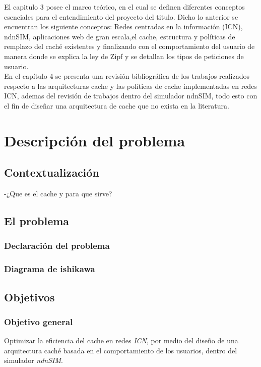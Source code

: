 \documentclass[12pt]{ociamthesis}  %
\begin{document}
El capitulo 3 posee el marco teórico, en el cual se definen diferentes conceptos esenciales para el entendimiento del proyecto del titulo. Dicho lo anterior se encuentran los siguiente conceptos: Redes centradas en la información (ICN), ndnSIM, aplicaciones web de gran escala,el cache, estructura y políticas de remplazo del caché existentes y finalizando con el comportamiento del usuario de manera donde se explica la ley de Zipf y se detallan los tipos de peticiones de usuario.\\

En el capítulo 4 se presenta una revisión bibliográfica de los trabajos realizados respecto a las arquitecturas cache y las políticas de cache implementadas en redes ICN, ademas del revisión de trabajos dentro del simulador ndnSIM, todo esto con el fin de diseñar una arquitectura de cache que no exista en la literatura.\\

\chapter{Descripción del problema}

\section{Contextualización}
-¿Que es el cache y para que sirve?
\section{El problema}
\subsection{Declaración del problema}
\subsection{Diagrama de ishikawa}

\section{Objetivos}
\subsection{Objetivo general}
Optimizar la eficiencia del cache en redes \textit{ICN}, por medio del diseño de una arquitectura caché basada en el comportamiento de los usuarios, dentro del simulador \textit{ndnSIM}.
\end{document}
